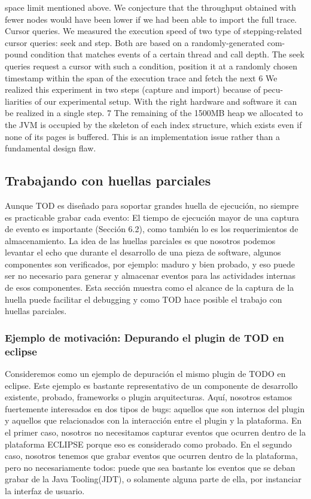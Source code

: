 \documentclass[12pt,a4paper]{report}
\begin{document}
space limit mentioned above. We conjecture that the throughput obtained with
fewer nodes would have been lower if we had been able to import the full trace.
Cursor queries. We measured the execution speed of two type of stepping-related
cursor queries: seek and step. Both are based on a randomly-generated com-
pound condition that matches events of a certain thread and call depth. The
seek queries request a cursor with such a condition, position it at a randomly
chosen timestamp within the span of the execution trace and fetch the next
 6
   We realized this experiment in two steps (capture and import) because of pecu-
   liarities of our experimental setup. With the right hardware and software it can be
   realized in a single step.
 7
   The remaining of the 1500MB heap we allocated to the JVM is occupied by the
   skeleton of each index structure, which exists even if none of its pages is buffered.
   This is an implementation issue rather than a fundamental design flaw.






		\subsection{Trabajando con huellas parciales}

	Aunque TOD es diseñado para soportar grandes huella de ejecución, no siempre es practicable grabar cada evento:  El tiempo de ejecución mayor de una captura de evento es importante (Sección 6.2), como también lo es los requerimientos de almacenamiento.  La idea de las huellas parciales es que nosotros podemos levantar el echo que durante el desarrollo de una pieza de software, algunos componentes son verificados, por ejemplo: maduro y bien probado, y eso puede ser no necesario para generar y almacenar eventos para las actividades internas de esos componentes.  Esta sección muestra como el alcance de la captura de la huella puede facilitar el debugging y como TOD hace posible el trabajo con huellas parciales.

			\subsubsection[Ejemplo de motivación]{Ejemplo de motivación: Depurando el plugin de TOD en eclipse}

Consideremos como un ejemplo de depuración el mismo plugin de TODO en eclipse.  Este ejemplo es bastante representativo de un componente de desarrollo existente, probado, frameworks o plugin arquitecturas.  Aquí, nosotros estamos fuertemente interesados en dos tipos de bugs:  aquellos que son internos del plugin y aquellos que relacionados con la interacción entre el plugin y la plataforma.  En el primer caso, nosotros no necesitamos capturar eventos que ocurren dentro de la plataforma ECLIPSE porque eso es considerado como probado.  En el segundo caso, nosotros tenemos que grabar eventos que ocurren dentro de la plataforma, pero no necesariamente todos:  puede que sea bastante los eventos que se deban grabar de la Java Tooling(JDT), o solamente alguna parte de ella, por instanciar la interfaz de usuario.
\end{document}
